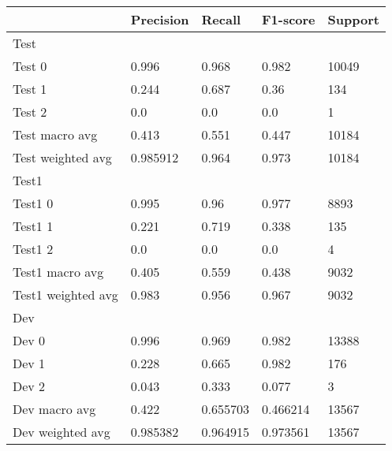\begin{tabular}{lllll}
\toprule
{} & Precision &    Recall &  F1-score & Support \\
\midrule
Test               &           &           &           &         \\
Test 0             &     0.996 &     0.968 &     0.982 &   10049 \\
Test 1             &     0.244 &     0.687 &      0.36 &     134 \\
Test 2             &       0.0 &       0.0 &       0.0 &       1 \\
Test macro avg     &     0.413 &     0.551 &     0.447 &   10184 \\
Test weighted avg  &  0.985912 &     0.964 &     0.973 &   10184 \\
Test1              &           &           &           &         \\
Test1 0            &     0.995 &      0.96 &     0.977 &    8893 \\
Test1 1            &     0.221 &     0.719 &     0.338 &     135 \\
Test1 2            &       0.0 &       0.0 &       0.0 &       4 \\
Test1 macro avg    &     0.405 &     0.559 &     0.438 &    9032 \\
Test1 weighted avg &     0.983 &     0.956 &     0.967 &    9032 \\
Dev                &           &           &           &         \\
Dev 0              &     0.996 &     0.969 &     0.982 &   13388 \\
Dev 1              &     0.228 &     0.665 &     0.982 &     176 \\
Dev 2              &     0.043 &     0.333 &     0.077 &       3 \\
Dev macro avg      &     0.422 &  0.655703 &  0.466214 &   13567 \\
Dev weighted avg   &  0.985382 &  0.964915 &  0.973561 &   13567 \\
\bottomrule
\end{tabular}
